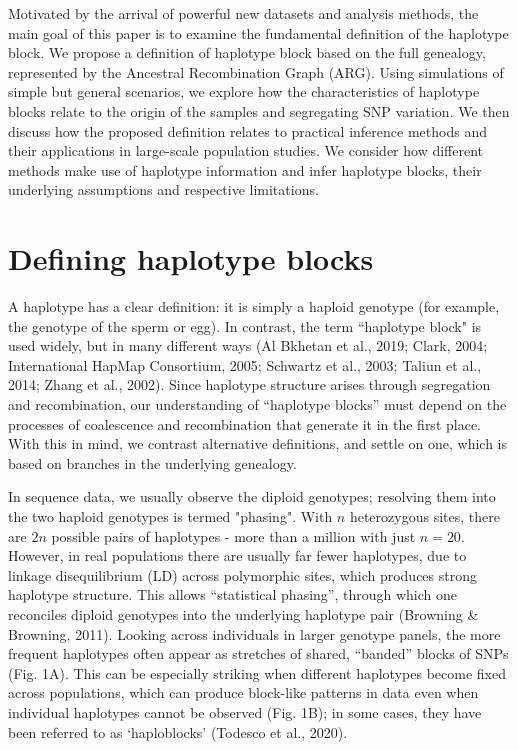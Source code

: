 \documentclass[twocolumn]{bmcart}%
\begin{document}
Motivated by the arrival of powerful new datasets and analysis methods, the main goal of this paper is to examine the fundamental definition of the haplotype block. We propose a definition of haplotype block based on the full genealogy, represented by the Ancestral Recombination Graph (ARG). Using simulations of simple but general scenarios, we explore how the characteristics of haplotype blocks relate to the origin of the samples and segregating SNP variation. We then discuss how the proposed definition relates to practical inference methods and their applications in large-scale population studies. We consider how different methods make use of haplotype information and infer haplotype blocks, their underlying assumptions and respective limitations.

\section*{Defining haplotype blocks}
A haplotype has a clear definition: it is simply a haploid genotype (for example, the genotype of the sperm or egg). In contrast, the term “haplotype block" is used widely, but in many different ways (Al Bkhetan et al., 2019; Clark, 2004; International HapMap Consortium, 2005; Schwartz et al., 2003; Taliun et al., 2014; Zhang et al., 2002). Since haplotype structure arises through segregation and recombination, our understanding of “haplotype blocks” must depend on the processes of coalescence and recombination that generate it in the first place. With this in mind, we contrast alternative definitions, and settle on one, which is based on branches in the underlying genealogy.

In sequence data, we usually observe the diploid genotypes; resolving them into the two haploid genotypes is termed "phasing". With $n$ heterozygous sites, there are $2n$ possible pairs of haplotypes - more than a million with just $n = 20$. However, in real populations there are usually far fewer haplotypes, due to linkage disequilibrium (LD) across polymorphic sites, which produces strong haplotype structure. This allows “statistical phasing”, through which one reconciles diploid genotypes into the underlying haplotype pair (Browning \& Browning, 2011). Looking across individuals in larger genotype panels, the more frequent haplotypes often appear as stretches of shared, “banded” blocks of SNPs (Fig. 1A). This can be especially striking when different haplotypes become fixed across populations, which can produce block-like patterns in data even when individual haplotypes cannot be observed (Fig. 1B); in some cases, they have been referred to as ‘haploblocks’ (Todesco et al., 2020).
\end{document}
